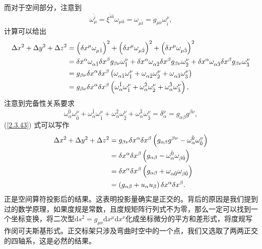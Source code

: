 \documentclass[11pt, a4paper, oneside, onecolumn]{ctexart}
\numberwithin{equation}{subsection}
\begin{document}
而对于空间部分，注意到
\begin{equation}
\omega_{\mu}^{\hat{i}}=\xi^{\hat{i}\hat{a}}\omega_{\mu\hat{a}}=\omega_{\mu\hat{i}}=g_{\mu\nu}\omega^{\nu}_{\hat{i}},
\end{equation}
计算可以给出
\begin{align}
\Delta{}x^{2}+\Delta{}y^{2}+\Delta{}z^{2}&=\left(\delta{}x^{\mu}\omega_{\mu\hat{1}}\right)^{2}+\left(\delta{}x^{\mu}\omega_{\mu\hat{2}}\right)^{2}+\left(\delta{}x^{\mu}\omega_{\mu\hat{3}}\right)^{2}\notag\\
&=\delta{}x^{\alpha}\omega_{\alpha\hat{1}}\delta{}x^{\beta}g_{\beta\nu}\omega^{\nu}_{\hat{1}}+\delta{}x^{\alpha}\omega_{\alpha\hat{2}}\delta{}x^{\beta}g_{\beta\nu}\omega^{\nu}_{\hat{2}}+\delta{}x^{\alpha}\omega_{\alpha\hat{3}}\delta{}x^{\beta}g_{\beta\nu}\omega^{\nu}_{\hat{3}}\notag\\
&=g_{\beta\nu}\delta{}x^{\alpha}\delta{}x^{\beta}\left(\omega_{\alpha\hat{1}}\omega^{\nu}_{\hat{1}}+\omega_{\alpha\hat{2}}\omega^{\nu}_{\hat{2}}+\omega_{\alpha\hat{3}}\omega^{\nu}_{\hat{3}}\right)\notag\\
&=g_{\beta\nu}\delta{}x^{\alpha}\delta{}x^{\beta}\left(\omega_{\alpha}^{\hat{1}}\omega^{\nu}_{\hat{1}}+\omega_{\alpha}^{\hat{2}}\omega^{\nu}_{\hat{2}}+\omega_{\alpha}^{\hat{3}}\omega^{\nu}_{\hat{3}}\right),\label{2.3.43}
\end{align}
注意到完备性关系要求
\begin{equation}
\omega_{\alpha}^{\hat{0}}\omega^{\nu}_{\hat{0}}+\omega_{\alpha}^{\hat{1}}\omega^{\nu}_{\hat{1}}+\omega_{\alpha}^{\hat{2}}\omega^{\nu}_{\hat{2}}+\omega_{\alpha}^{\hat{3}}\omega^{\nu}_{\hat{3}}=\delta{}^{\nu}_{\alpha}=g_{\alpha\beta}g^{\beta\nu},
\end{equation}
(\ref{2.3.43}) 式可以写作
\begin{align}
\Delta{}x^{2}+\Delta{}y^{2}+\Delta{}z^{2}&=g_{\beta\nu}\delta{}x^{\alpha}\delta{}x^{\beta}\left(g_{\alpha\beta}g^{\beta\nu}-\omega_{\alpha}^{\hat{0}}\omega^{\nu}_{\hat{0}}\right)\notag\\
&=\delta{}x^{\alpha}\delta{}x^{\beta}\left(g_{\alpha\beta}-\omega^{\hat{0}}_{\alpha}\omega_{\beta\hat{0}}\right)\notag\\
&=\delta{}x^{\alpha}\delta{}x^{\beta}\left(g_{\alpha\beta}+\omega_{\alpha\hat{0}}\omega_{\beta\hat{0}}\right)\notag\\
&=\left(g_{\alpha\beta}+u_{\alpha}u_{\beta}\right)\delta{}x^{\alpha}\delta{}x^{\beta}.
\end{align}
正是空间算符投影后的结果。这表明投影量确实是正交的。背后的原因是我们提到过的数学原理，如果度规是常数，且度规矩阵行列式不为零，那么一定可以找到一个坐标变换，将二次型$\mathrm{d}s^{2}=g_{\mu\nu}\mathrm{d}x^{\mu}\mathrm{d}x^{\nu}$化成坐标微分的平方和差形式，将度规写作闵可夫斯基形式。正交标架只涉及弯曲时空中的一个点，我们又选取了两两正交的四轴系，这是必然的结果。
\end{document}
